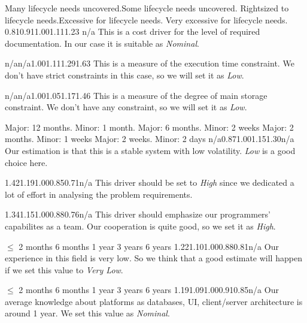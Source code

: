 {Many life\-cycle needs uncovered.}{Some life\-cycle needs uncovered.}
{Right\-sized to life\-cycle needs.}{Excessive for life\-cycle needs.}
{Very excessive for life\-cycle needs.}{ } 
{0.81}{0.91}{1.00}{1.11}{1.23}{ n/a } { 
    This is a cost driver for the level of required documentation. 
    In our case it is suitable as \emph{Nominal}.
}

\pagebreak

{n/a}{n/a}{1.00}{1.11}{1.29}{1.63} {
    This is a measure of the execution time constraint. We don't have strict constraints in this case, so we will set it as \emph{Low}.
}

{n/a}{n/a}{1.00}{1.05}{1.17}{1.46} {
    This is a measure of the degree of main storage constraint. 
    We don't have any constraint, so we will set it as \emph{Low}.
}

{ }{Major: 12 months. Minor: 1 month.}
{ Major: 6 months. Minor: 2 weeks } { Major: 2 months. Minor: 1 weeks }
{ Major: 2 weeks. Minor: 2 days } { }
{n/a}{0.87}{1.00}{1.15}{1.30}{n/a} {
    Our estimation is that this is a stable system with low volatility.
    \emph{Low} is a good choice here.
}

{1.42}{1.19}{1.00}{0.85}{0.71}{n/a} {
    This driver should be set to \emph{High} since we dedicated a lot of
    effort in analysing the problem requirements.
}

{1.34}{1.15}{1.00}{0.88}{0.76}{n/a} {
    This driver should emphasize our programmers' capabilites as a team. 
    Our cooperation is quite good, so we set it as \emph{High}.
}

{ $ \leq $ 2 months } { 6 months } {1 year } {3 years} {6 years} { }
{1.22}{1.10}{1.00}{0.88}{0.81}{n/a} { 
    Our experience in this field is very low. So we think that a good estimate
    will happen if we set this value to \emph {Very Low}.
}

{ $ \leq $ 2 months } { 6 months } {1 year } {3 years} {6 years} { }
{1.19}{1.09}{1.00}{0.91}{0.85}{n/a} { 
    Our average knowledge about platforms as databases, UI, client/server architecture
    is around 1 year. We set this value as \emph{Nominal}.
}

